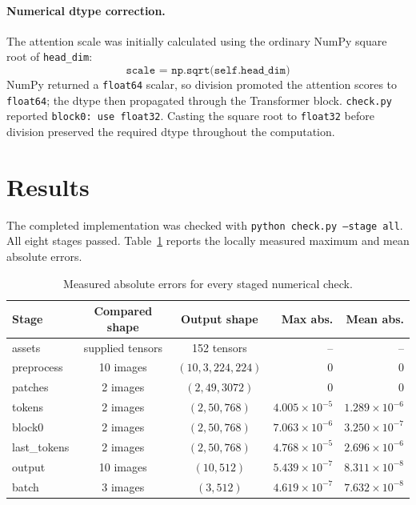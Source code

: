 \documentclass[a4paper,12pt]{article}
\begin{document}
\paragraph{Numerical dtype correction.}
The attention scale was initially calculated using the ordinary NumPy square
root of \texttt{head\_dim}:
\[
\texttt{scale = np.sqrt(self.head\_dim)}
\]
NumPy returned a \texttt{float64} scalar, so division promoted the attention
scores to \texttt{float64}; the dtype then propagated through the Transformer
block. \texttt{check.py} reported \texttt{block0: use float32}. Casting the
square root to \texttt{float32} before division preserved the required dtype
throughout the computation.

\section{Results}

The completed implementation was checked with
\texttt{python check.py --stage all}. All eight stages passed. Table~\ref{tab:results}
reports the locally measured maximum and mean absolute errors.

\begin{table}[H]
\centering
\small
\setlength{\tabcolsep}{4pt}
\renewcommand{\arraystretch}{1.05}
\begin{tabular}{@{}lccrr@{}}
\toprule
Stage & Compared shape & Output shape & Max abs. & Mean abs. \\
\midrule
assets & supplied tensors & 152 tensors & -- & -- \\
preprocess & 10 images & \((10,3,224,224)\) & \(0\) & \(0\) \\
patches & 2 images & \((2,49,3072)\) & \(0\) & \(0\) \\
tokens & 2 images & \((2,50,768)\) & \(4.005\times10^{-5}\) & \(1.289\times10^{-6}\) \\
block0 & 2 images & \((2,50,768)\) & \(7.063\times10^{-6}\) & \(3.250\times10^{-7}\) \\
last\_tokens & 2 images & \((2,50,768)\) & \(4.768\times10^{-5}\) & \(2.696\times10^{-6}\) \\
output & 10 images & \((10,512)\) & \(5.439\times10^{-7}\) & \(8.311\times10^{-8}\) \\
batch & 3 images & \((3,512)\) & \(4.619\times10^{-7}\) & \(7.632\times10^{-8}\) \\
\bottomrule
\end{tabular}
\caption{Measured absolute errors for every staged numerical check.}
\label{tab:results}
\end{table}
\end{document}

